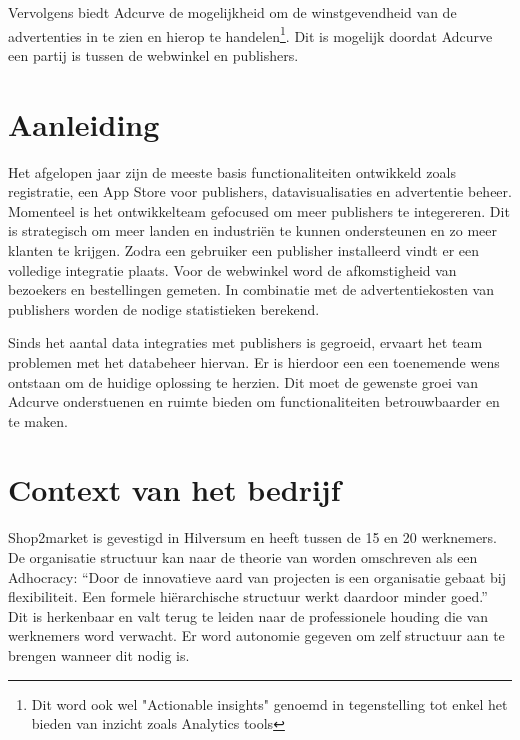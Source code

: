 Vervolgens biedt Adcurve de mogelijkheid om de winstgevendheid van de advertenties in te zien en hierop te handelen\footnote{Dit word ook wel "Actionable insights" genoemd in tegenstelling tot enkel het bieden van inzicht zoals Analytics tools}. Dit is mogelijk doordat Adcurve een partij is tussen de webwinkel en publishers.

\section{Aanleiding} %

Het afgelopen jaar zijn de meeste basis functionaliteiten ontwikkeld zoals registratie, een App Store voor publishers, datavisualisaties en advertentie beheer. Momenteel is het ontwikkelteam gefocused om meer publishers te integereren. Dit is strategisch om meer landen en industriën te kunnen ondersteunen en zo meer klanten te krijgen. Zodra een gebruiker een publisher installeerd vindt er een volledige integratie plaats. Voor de webwinkel word de afkomstigheid van bezoekers en bestellingen gemeten. In combinatie met de advertentiekosten van publishers worden de nodige statistieken berekend.

Sinds het aantal data integraties met publishers is gegroeid, ervaart het team problemen met het databeheer hiervan. Er is hierdoor een een toenemende wens ontstaan om de huidige oplossing te herzien. Dit moet de gewenste groei van Adcurve onderstuenen en ruimte bieden om functionaliteiten betrouwbaarder en te maken.

\section{Context van het bedrijf} %

Shop2market is gevestigd in Hilversum en heeft tussen de 15 en 20 werknemers. De organisatie structuur kan naar de theorie van \autocite{mintzberg} worden omschreven als een Adhocracy: “Door de innovatieve aard van projecten is een organisatie gebaat bij flexibiliteit. Een formele hiërarchische structuur werkt daardoor minder goed.” Dit is herkenbaar en valt terug te leiden naar de professionele houding die van werknemers word verwacht. Er word autonomie gegeven om zelf structuur aan te brengen wanneer dit nodig is.



